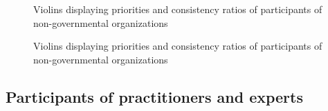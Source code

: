 \documentclass [oneside,10pt,a4paper,ngerman,BCOR10mm,headsepline,parindent,final]{scrartcl}
\begin{document}
    \begin{figure}
        \begin{center}\end{center}
        \caption{Violins displaying priorities and consistency ratios of participants of non-governmental organizations}
        \label{fig:violins_all_attributes}
    \end{figure}
    
    \begin{figure}
        \begin{center}\end{center}
        \caption{Violins displaying priorities and consistency ratios of participants of non-governmental organizations}
        \label{fig:violins_all_attributes}
    \end{figure}
    
    \hypertarget{participants-of-practitioners-and-experts}{%
\subsection{Participants of practitioners and
experts}\label{participants-of-practitioners-and-experts}}
\end{document}
